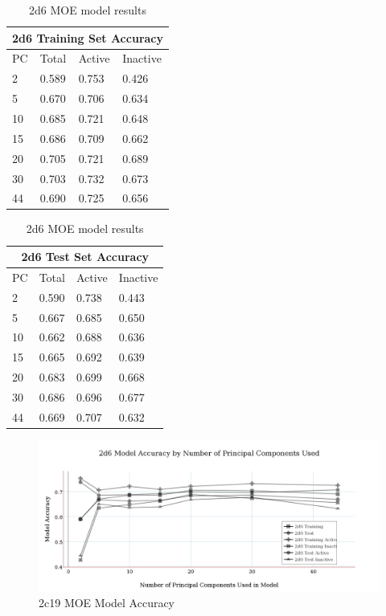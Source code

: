 \begin{table}[!h]
\begin{minipage}{.5\linewidth}
\centering
\begin{tabular}{|l|l|l|l|}
\hline
\multicolumn{4}{|c|}{2d6 Training Set Accuracy} \\ \hline
PC & Total          & Active          & Inactive\\ \hline
2  & 0.589          & 0.753           & 0.426   \\ \hline
5  & 0.670          & 0.706           & 0.634   \\ \hline
10 & 0.685          & 0.721           & 0.648   \\ \hline
15 & 0.686          & 0.709           & 0.662   \\ \hline
20 & 0.705          & 0.721           & 0.689   \\ \hline
30 & 0.703          & 0.732           & 0.673   \\ \hline
44 & 0.690          & 0.725           & 0.656   \\ \hline
\end{tabular}
\end{minipage}
\begin{minipage}{.5\linewidth}
\centering
\begin{tabular}{|l|l|l|l|}
\hline
\multicolumn{4}{|c|}{2d6 Test Set Accuracy}      \\ \hline
PC & Total          & Active          & Inactive \\ \hline
2  & 0.590          & 0.738           & 0.443    \\ \hline
5  & 0.667          & 0.685           & 0.650    \\ \hline
10 & 0.662          & 0.688           & 0.636    \\ \hline
15 & 0.665          & 0.692           & 0.639    \\ \hline
20 & 0.683          & 0.699           & 0.668    \\ \hline
30 & 0.686          & 0.696           & 0.677    \\ \hline
44 & 0.669          & 0.707           & 0.632    \\ \hline
\end{tabular}
\end{minipage}
\caption{2d6 MOE model results}
\end{table}

\begin{figure}[!h]
\includegraphics[width=1\textwidth]{../img/2d6_moe_model_accuracy.png}
\caption{2c19 MOE Model Accuracy}
\end{figure}

